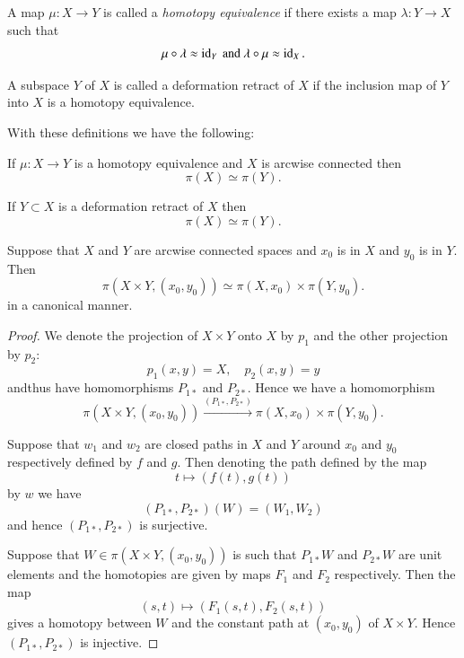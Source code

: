 A map $\mu:X \to Y$ is called a \textit{homotopy equivalence} if there
exists a map $\lambda :Y \to X$ such that 
$$
\mu\circ\lambda \approx \operatorname{id}_Y \text{ and } \lambda\circ\mu \approx \operatorname{id}_X.  
$$

A subspace $Y$ of $X$ is called a deformation retract of $X$ if the
inclusion map of $Y$ into $X$ is a homotopy equivalence. 

With these definitions we have the following:

\begin{corollary}\label{cor2}%
If $\mu:X \to Y$ is a homotopy equivalence and $X$ is arcwise
connected then 
$$
\pi (X) \simeq \pi (Y). 
$$
\end{corollary}

\begin{corollary}\label{cor3} %
If $Y \subset X $ is a deformation retract of $X$ then 
$$
\pi (X) \simeq \pi (Y).
$$
\end{corollary}

\begin{theorem}\label{thm1.2} %
Suppose that $X$ and $Y$ are arcwise connected spaces and $x_0$ is in
$X$ and $y_0$ is in $Y$. Then 
$$
\pi (X \times Y, (x_0,y_0)) \simeq \pi(X,x_0) \times \pi
(Y,y_0). 
$$
in a canonical manner.
\end{theorem}

\begin{proof}
We denote the projection of $X \times Y$ onto $X$ by $p_1$ and the
other projection by $p_2$: 
$$
p_1 (x,y) = X, \quad p_2(x,y)= y 
$$
and\pageoriginale thus have homomorphisms $P_{1\ast}$ and
$P_{2\ast}$. Hence we have a homomorphism 
$$
\pi (X \times Y, (x_0,y_0)) \xrightarrow{(P_{1 \ast},P_{2 \ast})} \pi 
(X,x_0) \times \pi (Y,y_0). 
$$

Suppose that $w_1$ and $w_2$ are closed paths in $X$ and $Y$ around
$x_0$ and $y_0$ respectively defined by $f$ and $g$. Then denoting the
path defined by the map 
$$
t \longmapsto (f(t),g(t)) 
$$
by $w$ we have
$$
(P_{1\ast}, P_{2\ast}) (W)=(W_1,W_2)
$$
and hence $(P_{1 \ast}, P_{2\ast})$ is surjective.

Suppose that $W \in \pi (X \times Y, (x_0,y_0))$ is such that
$P_{1\ast}W$ and $P_{2\ast}W$ are unit elements and the homotopies are given
by maps $F_1$ and $F_2$ respectively. Then the map 
$$
(s,t)\longmapsto (F_1 (s,t),F_2 (s,t)) 
$$
gives a homotopy between $W$ and the constant path at $(x_0,y_0)$ of
$X \times Y$. Hence $(P_{1\ast}, P_{2 \ast})$ is injective. 
\end{proof}

